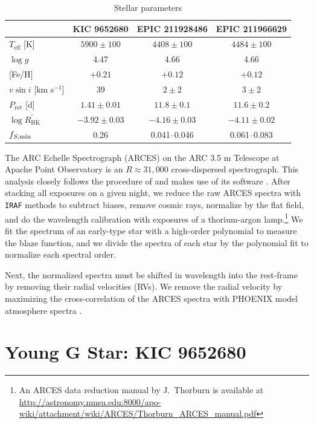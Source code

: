 \begin{table}
\begin{tabular}{l|ccc}
 & KIC 9652680 & EPIC 211928486 & EPIC 211966629\\ \hline
$T_\mathrm{eff}$ [K] & $5900 \pm 100$ & $4408\pm 100$ & $4484\pm 100$ \\
$\log g$ & 4.47 & 4.66 & 4.66 \\
$[$Fe/H$]$ & $+0.21$ & $+0.12$ & $+0.12$ \\
$v \sin  i$ [km s$^{-1}$] & 39 & $2\pm2$ & $3\pm2$ \\
$P_\mathrm{rot}$ [d] & $1.41 \pm 0.01$ & $11.8 \pm 0.1$ & $11.6 \pm 0.2$ \\
$\log R^\prime_\mathrm{HK}$ & $-3.92 \pm 0.03$ & $-4.16 \pm 0.03$ & $-4.11 \pm 0.02$  \\
$f_{S, \rm min}$ & 0.26 & 0.041--0.046 &  0.061--0.083
\end{tabular}
\caption{Stellar parameters\label{tab:stellarprops}}
\end{table}

The ARC Echelle Spectrograph (ARCES) on the ARC 3.5 m Telescope at Apache Point Observatory is an $R\approx31,000$ cross-dispersed spectrograph.  This analysis closely follows the procedure of \citet{Morris2017b} and makes use of its software \citep{aesop}. After stacking all exposures on a given night, we reduce the raw ARCES spectra with \texttt{IRAF} methods to subtract biases, remove cosmic rays, normalize by the flat field, and do the wavelength calibration with exposures of a thorium-argon lamp.\footnote{An ARCES data reduction manual by J.~Thorburn is available at \url{http://astronomy.nmsu.edu:8000/apo-wiki/attachment/wiki/ARCES/Thorburn_ARCES_manual.pdf}} We fit the spectrum of an early-type star with a high-order polynomial to measure the blaze function, and we divide the spectra of each star by the polynomial fit to normalize each spectral order.

Next, the normalized spectra must be shifted in wavelength into the rest-frame by removing their radial velocities (RVs). We remove the radial velocity by maximizing the cross-correlation of the ARCES spectra with PHOENIX model atmosphere spectra \citep{Husser2013}.

\section{Young G Star: KIC 9652680} \label{sec:gstar}
